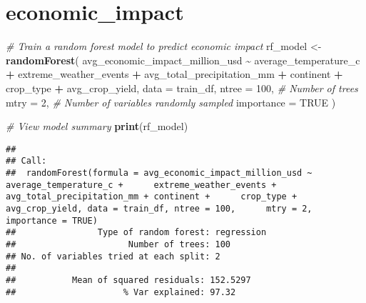\documentclass[
]{article}
\newenvironment{Shaded}{\begin{snugshade}}{\end{snugshade}}
\newcommand{\AttributeTok}[1]{\textcolor[rgb]{0.13,0.29,0.53}{#1}}
\newcommand{\CommentTok}[1]{\textcolor[rgb]{0.56,0.35,0.01}{\textit{#1}}}
\newcommand{\ConstantTok}[1]{\textcolor[rgb]{0.56,0.35,0.01}{#1}}
\newcommand{\DecValTok}[1]{\textcolor[rgb]{0.00,0.00,0.81}{#1}}
\newcommand{\FunctionTok}[1]{\textcolor[rgb]{0.13,0.29,0.53}{\textbf{#1}}}
\newcommand{\NormalTok}[1]{#1}
\newcommand{\OtherTok}[1]{\textcolor[rgb]{0.56,0.35,0.01}{#1}}
\newcommand{\SpecialCharTok}[1]{\textcolor[rgb]{0.81,0.36,0.00}{\textbf{#1}}}
\newcommand{\StringTok}[1]{\textcolor[rgb]{0.31,0.60,0.02}{#1}}
\begin{document}
\hypertarget{economic_impact}{%
\section{economic\_impact}\label{economic_impact}}

\begin{Shaded}
\begin{Highlighting}[]
\CommentTok{\# Train a random forest model to predict economic impact}
\NormalTok{rf\_model }\OtherTok{\textless{}{-}} \FunctionTok{randomForest}\NormalTok{(}
\NormalTok{  avg\_economic\_impact\_million\_usd }\SpecialCharTok{\textasciitilde{}}\NormalTok{ average\_temperature\_c }\SpecialCharTok{+}\NormalTok{ extreme\_weather\_events }\SpecialCharTok{+} 
\NormalTok{    avg\_total\_precipitation\_mm }\SpecialCharTok{+}\NormalTok{ continent }\SpecialCharTok{+}\NormalTok{ crop\_type }\SpecialCharTok{+}\NormalTok{ avg\_crop\_yield,}
  \AttributeTok{data =}\NormalTok{ train\_df,}
  \AttributeTok{ntree =} \DecValTok{100}\NormalTok{, }\CommentTok{\# Number of trees}
  \AttributeTok{mtry =} \DecValTok{2}\NormalTok{,    }\CommentTok{\# Number of variables randomly sampled}
  \AttributeTok{importance =} \ConstantTok{TRUE}
\NormalTok{)}

\CommentTok{\# View model summary}
\FunctionTok{print}\NormalTok{(rf\_model)}
\end{Highlighting}
\end{Shaded}

\begin{verbatim}
## 
## Call:
##  randomForest(formula = avg_economic_impact_million_usd ~ average_temperature_c +      extreme_weather_events + avg_total_precipitation_mm + continent +      crop_type + avg_crop_yield, data = train_df, ntree = 100,      mtry = 2, importance = TRUE) 
##                Type of random forest: regression
##                      Number of trees: 100
## No. of variables tried at each split: 2
## 
##           Mean of squared residuals: 152.5297
##                     % Var explained: 97.32
\end{verbatim}

\begin{Shaded}
\end{Shaded}
\end{document}
